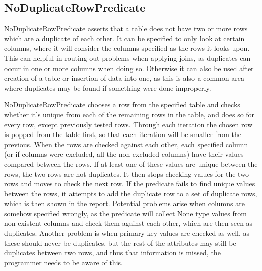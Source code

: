 \subsection{NoDuplicateRowPredicate}

NoDuplicateRowPredicate asserts that a table does not have two or more rows which are a duplicate of each other. It can be specified to only look at certain columns, where it will consider the columns specified as the rows it looks upon. This can helpful in routing out problems when applying joins, as duplicates can occur in one or more columns when doing so. Otherwise it can also be used after creation of a table or insertion of data into one, as this is also a common area where duplicates may be found if something were done improperly.
 

NoDuplicateRowPredicate chooses a row from the specified table and checks whether it's unique from each of the remaining rows in the table, and does so for every row, except previously tested rows. Through each iteration the chosen row is popped from the table first, so that each iteration will be smaller from the previous. When the rows are checked against each other, each specified column (or if columns were excluded, all the non-excluded columns) have their values compared between the rows. If at least one of these values are unique between the rows, the two rows are not duplicates. It then stops checking values for the two rows and moves to check the next row. If the predicate fails to find unique values between the rows, it attempts to add the duplicate row to a set of duplicate rows, which is then shown in the report. Potential problems arise when columns are somehow specified wrongly, as the predicate will collect None type values from non-existent columns and check them against each other, which are then seen as duplicates. Another problem is when primary key values are checked as well, as these should never be duplicates, but the rest of the attributes may still be duplicates between two rows, and thus that information is missed, the programmer needs to be aware of this.

